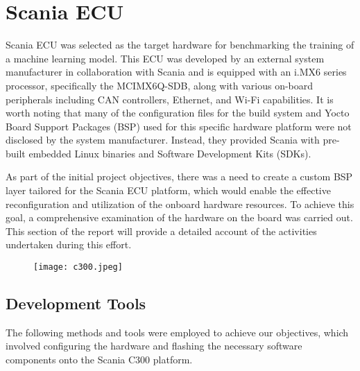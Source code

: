 \chapter{Scania ECU} \label{rtc-c300}


Scania ECU was selected as the target hardware for benchmarking the training of a machine learning model. This ECU was developed by an external system manufacturer in collaboration with Scania and is equipped with an i.MX6 series processor, specifically the MCIMX6Q-SDB, along with various on-board peripherals including CAN controllers, Ethernet, and Wi-Fi capabilities. It is worth noting that many of the configuration files for the build system and Yocto Board Support Packages (BSP) used for this specific hardware platform were not disclosed by the system manufacturer. Instead, they provided Scania with pre-built embedded Linux binaries and Software Development Kits (SDKs).

As part of the initial project objectives, there was a need to create a custom BSP layer tailored for the Scania ECU platform, which would enable the effective reconfiguration and utilization of the onboard hardware resources. To achieve this goal, a comprehensive examination of the hardware on the board was carried out. This section of the report will provide a detailed account of the activities undertaken during this effort.

\begin{figure}[h]
	\centering
	\texttt{[image: c300.jpeg]}
\end{figure}

\section*{Development Tools}

The following methods and tools were employed to achieve our objectives, which involved configuring the hardware and flashing the necessary software components onto the Scania C300 platform.

